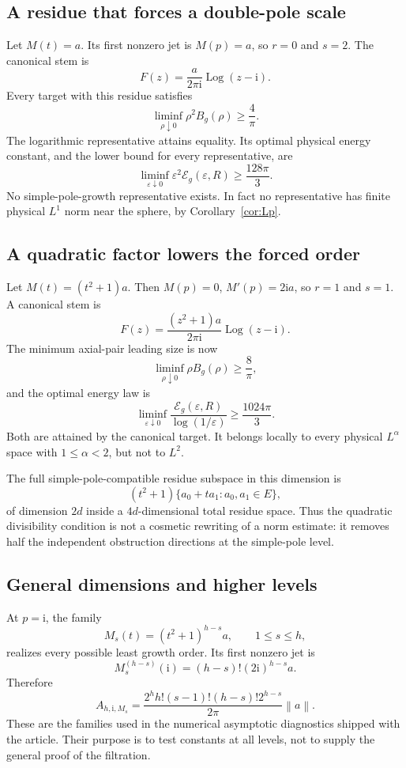 \documentclass[11pt,a4paper]{article}
\numberwithin{equation}{section}
\theoremstyle{definition}
\theoremstyle{remark}
\newcommand{\ii}{\mathrm i}
\newcommand{\norm}[1]{\left\lVert#1\right\rVert}
\begin{document}
\subsection{A residue that forces a double-pole scale}

Let $M(t)=a$. Its first nonzero jet is $M(p)=a$, so $r=0$ and $s=2$.
The canonical stem is
\[
 F(z)=\frac{a}{2\pi\ii}\operatorname{Log}(z-\ii).
\]
Every target with this residue satisfies
\[
 \liminf_{\rho\downarrow0}\rho^2B_g(\rho)\ge\frac4\pi.
\]
The logarithmic representative attains equality. Its optimal physical energy
constant, and the lower bound for every representative, are
\[
 \liminf_{\varepsilon\downarrow0}\varepsilon^2\mathcal E_g(\varepsilon,R)
 \ge\frac{128\pi}{3}.
\]
No simple-pole-growth representative exists. In fact no representative has
finite physical $L^1$ norm near the sphere, by Corollary~\ref{cor:Lp}.

\subsection{A quadratic factor lowers the forced order}

Let $M(t)=(t^2+1)a$. Then $M(p)=0$, $M'(p)=2\ii a$, so $r=1$ and $s=1$.
A canonical stem is
\[
 F(z)=\frac{(z^2+1)a}{2\pi\ii}\operatorname{Log}(z-\ii).
\]
The minimum axial-pair leading size is now
\[
 \liminf_{\rho\downarrow0}\rho B_g(\rho)\ge\frac8\pi,
\]
and the optimal energy law is
\[
 \liminf_{\varepsilon\downarrow0}
 \frac{\mathcal E_g(\varepsilon,R)}{\log(1/\varepsilon)}
 \ge\frac{1024\pi}{3}.
\]
Both are attained by the canonical target. It belongs locally to every
physical $L^\alpha$ space with $1\le\alpha<2$, but not to $L^2$.

The full simple-pole-compatible residue subspace in this dimension is
\[
 (t^2+1)\{a_0+ta_1:a_0,a_1\in E\},
\]
of dimension $2d$ inside a $4d$-dimensional total residue space. Thus the
quadratic divisibility condition is not a cosmetic rewriting of a norm
estimate: it removes half the independent obstruction directions at the
simple-pole level.

\subsection{General dimensions and higher levels}

At $p=\ii$, the family
\[
 M_s(t)=(t^2+1)^{h-s}a,\qquad 1\le s\le h,
\]
realizes every possible least growth order. Its first nonzero jet is
\[
 M_s^{(h-s)}(\ii)=(h-s)!(2\ii)^{h-s}a.
\]
Therefore
\[
 A_{h,\ii,M_s}=
 \frac{2^hh!(s-1)!(h-s)!2^{h-s}}{2\pi}\norm a.
\]
These are the families used in the numerical asymptotic diagnostics shipped
with the article. Their purpose is to test constants at all levels, not to
supply the general proof of the filtration.
\end{document}

